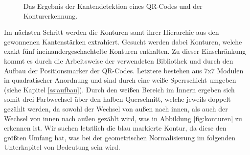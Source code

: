 \documentclass[a4paper, oneside, 12pt]{article}
\begin{document}
\begin{figure}[h]
	\begin{center}
	\end{center}
	\caption{Das Ergebnis der Kantendetektion eines QR-Codes und der Konturerkennung.}
	\label{fig:lokalisierung}
\end{figure}

Im nächsten Schritt werden die Konturen samt ihrer Hierarchie aus den gewonnenen Kantenstärken extrahiert. Gesucht werden dabei Konturen, welche exakt fünf ineinandergeschachtelte Konturen enthalten. Zu dieser Einschränkung kommt es durch die Arbeitsweise der verwendeten Bibliothek und durch den Aufbau der Positionsmarker der QR-Codes. Letztere bestehen aus 7x7 Modulen in quadratischer Anordnung und sind durch eine weiße Sperrschicht umgeben (siehe Kapitel \ref{ss:aufbau}). Durch den weißen Bereich im Innern ergeben sich somit drei Farbwechsel über den halben Querschnitt, welche jeweils doppelt gezählt werden, da sowohl der Wechsel von außen nach innen, als auch der Wechsel von innen nach außen gezählt wird, was in Abbildung \ref{fig:konturen} zu erkennen ist. Wir suchen letztlich die blau markierte Kontur, da diese den größten Umfang hat, was bei der geometrischen Normalisierung im folgenden Unterkapitel von Bedeutung sein wird.
\end{document}
